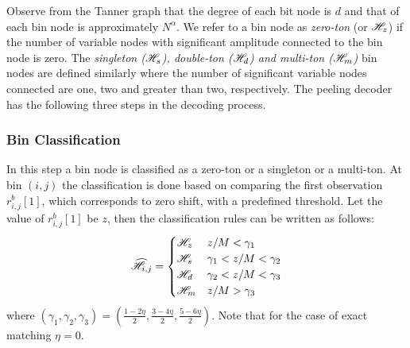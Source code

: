 \begin{enumerate}
	Observe from the Tanner graph that the degree of each bit node is $d$ and that of each bin node is approximately $N^{\alpha}$. 
We refer to a bin node as {\it zero-ton} (or $\mathscr{H}_z$) if the number of variable nodes with significant amplitude connected to the bin node is zero. The {\it singleton ($\mathscr{H}_s$), double-ton ($\mathscr{H}_d$) and multi-ton ($\mathscr{H}_m$)} bin nodes are defined similarly where the number of significant variable nodes connected are one, two and greater than two, respectively. The peeling decoder has the following three steps in the decoding process.\\

\subsubsection{Bin Classification} In this step a bin node is classified as a zero-ton or a singleton or a multi-ton. At bin $(i,j)$ the classification is done based on  comparing the first observation $r^{b}_{i,j}[1]$, which corresponds to zero shift, with a predefined threshold. Let the value of $r^{b}_{i,j}[1]$ be $z$, then the classification rules can be written as follows:\\
\begin{align}
\label{Eqn:BinClassifApprox}
\widehat{\mathscr{H}}_{i,j}=
\begin{cases}
\mathscr{H}_z &  	 z/M < \gamma_1\\
\mathscr{H}_s &	  \gamma_1 < z/M < \gamma_2  \\
\mathscr{H}_d  &    \gamma_2  < z/M <  \gamma_3\\ 
\mathscr{H}_m &      z/M > \gamma_3\\
\end{cases}
\end{align}
where $(\gamma_1,\gamma_2,\gamma_3)=(\frac{1-2\eta}{2},\frac{3-4\eta}{2},\frac{5-6\eta}{2})$. Note that for the case of exact matching $\eta=0$.
			   

\end{enumerate}

